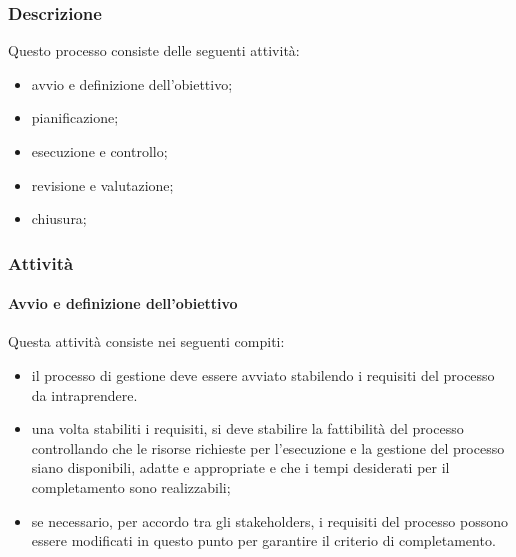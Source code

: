 		\subsubsection{Descrizione}
		Questo processo consiste delle seguenti attività:
		\begin{itemize}
			\item avvio e definizione dell'obiettivo;
			\item pianificazione;
			\item esecuzione e controllo;
			\item revisione e valutazione;
			\item chiusura;
		\end{itemize}
		\subsubsection{Attività}
		\paragraph{Avvio e definizione dell'obiettivo}
		Questa attività consiste nei seguenti compiti:
		\begin{itemize}
			\item il processo di gestione deve essere avviato stabilendo i requisiti del processo da intraprendere.
			\item una volta stabiliti i requisiti, si deve stabilire la fattibilità del processo controllando che le risorse richieste per l'esecuzione e la gestione del processo siano disponibili, adatte e appropriate e che i tempi desiderati per il completamento sono realizzabili;
			\item se necessario, per accordo tra gli stakeholders\glo, i requisiti del processo possono essere modificati in questo punto per garantire il criterio di completamento.
		\end{itemize}
